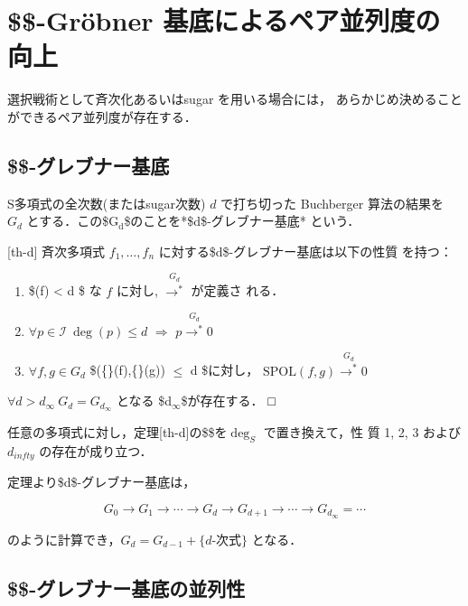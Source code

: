 \documentclass[a4j]{jarticle}
\begin{document}
{{\section{\$\$-Gröbner 基底によるペア並列度の向上}
\label{sec:org1ae2516}

選択戦術として斉次化あるいはsugar を用いる場合には，
あらかじめ決めることができるペア並列度が存在する．

\subsection{\$\$-グレブナー基底}
\label{sec:org9b63a92}

S多項式の全次数(またはsugar次数) \(d\) で打ち切った Buchberger
算法の結果を \(G_d\) とする．この\$G\(_{\text{d}}\)\$のことを*\$d\$-グレブナー基底*
という．

[th-d] 斉次多項式 \(f_1, \ldots, f_n\)
に対する\$d\$-グレブナー基底は以下の性質 を持つ：

\begin{enumerate}
\item \$\textdegree{}(f) < d \$ な \(f\) に対し,
\({{\!\stackrel{G_d}{\longrightarrow^{*}} }}\) が定義さ れる．

\item \(\forall p \in {\mathcal{I}} \ \deg(p) \le d\) \(\Rightarrow\)
\({{p\!\stackrel{G_d}{\longrightarrow^{*}} 0}}\)

\item \(\forall f, g \in G_d\)
\$\textdegree{}(\{\}(f),\{\}(g)) \(\le\) d \$に対し，
\({{{\mathrm{SPOL}}(f, g)\!\stackrel{G_d}{\longrightarrow^{*}} 0}}\)
\end{enumerate}

\(\forall d > d_\infty \ G_d = G_{d_\infty}\) となる
\$d\(_{\infty}\)\$が存在する． □

任意の多項式に対し，定理[th-d]の\$\textdegree{}\$を\(\deg_S\) で置き換えて，性 質 1,
2, 3 および\(d_{infty}\) の存在が成り立つ．

定理より\$d\$-グレブナー基底は，

$$G_0 \rightarrow
G_1 \rightarrow
\cdots \rightarrow
G_{d} \rightarrow 
G_{d+1} \rightarrow 
\cdots \rightarrow
G_{d_\infty} = \cdots$$

のように計算でき，\(G_d = G_{d-1} + \{d\mbox{-次式}\}\) となる．

\subsection{\$\$-グレブナー基底の並列性}
\label{sec:org5ed54f9}

}}
\end{document}
